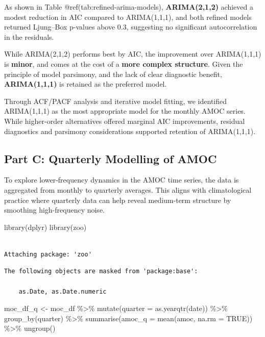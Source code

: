 \documentclass[
  11pt,
]{article}
\newenvironment{Shaded}{\begin{snugshade}}{\end{snugshade}}
\newcommand{\AttributeTok}[1]{\textcolor[rgb]{0.40,0.45,0.13}{#1}}
\newcommand{\ConstantTok}[1]{\textcolor[rgb]{0.56,0.35,0.01}{#1}}
\newcommand{\FunctionTok}[1]{\textcolor[rgb]{0.28,0.35,0.67}{#1}}
\newcommand{\NormalTok}[1]{\textcolor[rgb]{0.00,0.23,0.31}{#1}}
\newcommand{\OtherTok}[1]{\textcolor[rgb]{0.00,0.23,0.31}{#1}}
\newcommand{\SpecialCharTok}[1]{\textcolor[rgb]{0.37,0.37,0.37}{#1}}
\begin{document}
As shown in Table @ref(tab:refined-arima-models), \textbf{ARIMA(2,1,2)}
achieved a modest reduction in AIC compared to ARIMA(1,1,1), and both
refined models returned Ljung--Box p-values above 0.3, suggesting no
significant autocorrelation in the residuals.

While ARIMA(2,1,2) performs best by AIC, the improvement over
ARIMA(1,1,1) is \textbf{minor}, and comes at the cost of a \textbf{more
complex structure}. Given the principle of model parsimony, and the lack
of clear diagnostic benefit, \textbf{ARIMA(1,1,1)} is retained as the
preferred model.

Through ACF/PACF analysis and iterative model fitting, we identified
ARIMA(1,1,1) as the most appropriate model for the monthly AMOC series.
While higher-order alternatives offered marginal AIC improvements,
residual diagnostics and parsimony considerations supported retention of
ARIMA(1,1,1).

\subsection{Part C: Quarterly Modelling of
AMOC}\label{part-c-quarterly-modelling-of-amoc}

To explore lower-frequency dynamics in the AMOC time series, the data is
aggregated from monthly to quarterly averages. This aligns with
climatological practice where quarterly data can help reveal medium-term
structure by smoothing high-frequency noise.

\begin{Shaded}
\begin{Highlighting}[]
\FunctionTok{library}\NormalTok{(dplyr)}
\FunctionTok{library}\NormalTok{(zoo)}
\end{Highlighting}
\end{Shaded}

\begin{verbatim}

Attaching package: 'zoo'
\end{verbatim}

\begin{verbatim}
The following objects are masked from 'package:base':

    as.Date, as.Date.numeric
\end{verbatim}

\begin{Shaded}
\begin{Highlighting}[]
\NormalTok{moc\_df\_q }\OtherTok{\textless{}{-}}\NormalTok{ moc\_df }\SpecialCharTok{\%\textgreater{}\%}
  \FunctionTok{mutate}\NormalTok{(}\AttributeTok{quarter =} \FunctionTok{as.yearqtr}\NormalTok{(date)) }\SpecialCharTok{\%\textgreater{}\%}
  \FunctionTok{group\_by}\NormalTok{(quarter) }\SpecialCharTok{\%\textgreater{}\%}
  \FunctionTok{summarise}\NormalTok{(}\AttributeTok{amoc\_q =} \FunctionTok{mean}\NormalTok{(amoc, }\AttributeTok{na.rm =} \ConstantTok{TRUE}\NormalTok{)) }\SpecialCharTok{\%\textgreater{}\%}
  \FunctionTok{ungroup}\NormalTok{()}
\end{Highlighting}
\end{Shaded}
\end{document}
